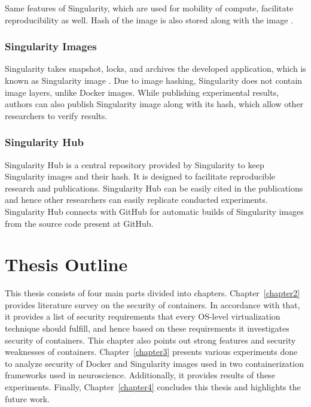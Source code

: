 Same features of Singularity, which are used for mobility of compute,
facilitate reproducibility as well. Hash of the image is also stored
along with the image \cite{kurtzer2017singularity}.


\subsubsection{Singularity Images}

Singularity takes snapshot, locks, and archives the developed application,
which is known as Singularity image \cite{kurtzer2016singularity}.
Due to image hashing, Singularity does not contain image layers, unlike
Docker images. While publishing experimental results, authors can also
publish Singularity image along with its hash, which allow other
researchers to verify results.


\subsubsection{Singularity Hub}

Singularity Hub is a central repository provided by Singularity to keep
Singularity images and their hash. It is designed to facilitate
reproducible research and publications. Singularity Hub can be easily
cited in the publications and hence other researchers can easily
replicate conducted experiments. Singularity Hub connects with
GitHub for automatic builds of Singularity images from the source
code present at GitHub.

\section{Thesis Outline}
This thesis consists of four main parts divided into chapters.
Chapter~\ref{chapter2} provides literature survey on the security of containers. 
In accordance with that, it provides a list of security requirements that 
every OS-level virtualization technique should fulfill, and hence based on 
these requirements it investigates security of containers. This chapter 
also points out strong features and security weaknesses of containers.
Chapter~\ref{chapter3} presents various experiments done to analyze security 
of Docker and Singularity images used in two containerization frameworks 
used in neuroscience. Additionally, it 
provides results of these experiments.
Finally, Chapter~\ref{chapter4} concludes this thesis and highlights the future work.
